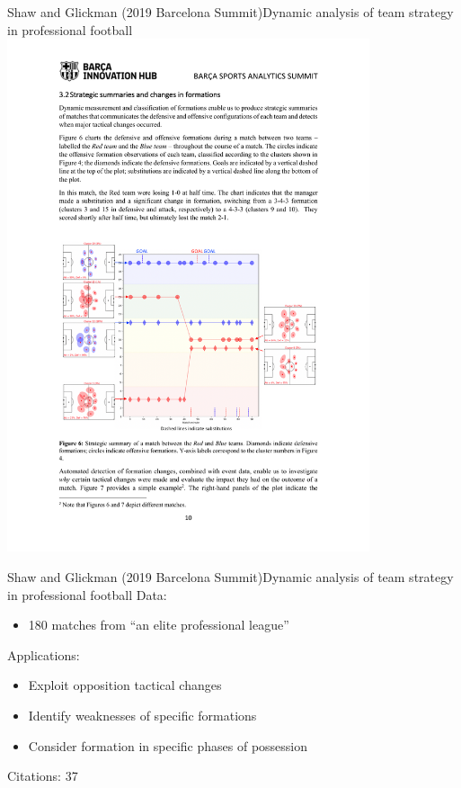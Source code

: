 \documentclass{beamer}
\begin{document}
  \begin{frame}{Shaw and Glickman (2019 Barcelona Summit)}{Dynamic analysis of team strategy in professional football}
    \centering
    \includegraphics[width = 0.8\textwidth]{images/shaw_glickman_2019.pdf}
  \end{frame}

  \begin{frame}{Shaw and Glickman (2019 Barcelona Summit)}{Dynamic analysis of team strategy in professional football}
    Data:
    \begin{itemize}
      \item 180 matches from ``an elite professional league''
    \end{itemize}
    Applications:
    \begin{itemize}
      \item Exploit opposition tactical changes
      \item Identify weaknesses of specific formations
      \item Consider formation in specific phases of possession
    \end{itemize}
    Citations: 37
  \end{frame}
\end{document}
